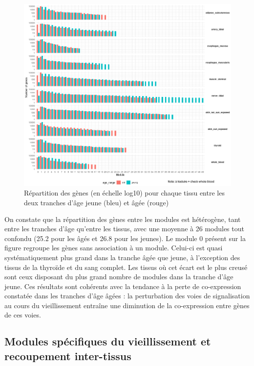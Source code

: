 \begin{figure}[hb]
    \centering
    \includegraphics[width=1\textwidth]{img/chap2/chap2_repartition_genes_modules_tissus.png}
    \caption{Répartition des gènes (en échelle log10) pour chaque tissu entre les deux tranches d'âge jeune (bleu) et âgée (rouge)}
    \label{figure:repartition_genes_modules_tissus}
\end{figure}

On constate que la répartition des gènes entre les modules est hétérogène, tant entre les tranches d'âge qu'entre les tissus, avec une moyenne à 26 modules tout confondu (25.2 pour les âgés et 26.8 pour les jeunes). Le module 0 présent sur la figure regroupe les gènes sans association à un module. Celui-ci est quasi systématiquement plus grand dans la tranche âgée que jeune, à l'exception des tissus de la thyroïde et du sang complet. Les tissus où cet écart est le plus creusé sont ceux disposant du plus grand nombre de modules dans la tranche d'âge jeune. Ces résultats sont cohérents avec la tendance à la perte de co-expression constatée dans les tranches d'âge âgées \cite{Southworth2009} : la perturbation des voies de signalisation au cours du vieillissement entraîne une diminution de la co-expression entre gènes de ces voies.

\subsection{Modules spécifiques du vieillissement et recoupement inter-tissus}

